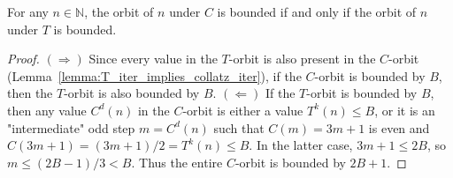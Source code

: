 \begin{lemma}\label{lemma:collatz_bounded_iff_compact_collatz_bounded}\leanok
For any $n \in \mathbb{N}$, the orbit of $n$ under $C$ is bounded if and only if the orbit of $n$ under $T$ is bounded.
\end{lemma}
\begin{proof}\leanok
$(\Rightarrow)$ Since every value in the $T$-orbit is also present in the $C$-orbit (Lemma~\ref{lemma:T_iter_implies_collatz_iter}), if the $C$-orbit is bounded by $B$, then the $T$-orbit is also bounded by $B$.
$(\Leftarrow)$ If the $T$-orbit is bounded by $B$, then any value $C^d(n)$ in the $C$-orbit is either a value $T^k(n) \le B$, or it is an "intermediate" odd step $m = C^d(n)$ such that $C(m) = 3m+1$ is even and $C(3m+1) = (3m+1)/2 = T^k(n) \le B$. In the latter case, $3m+1 \le 2B$, so $m \le (2B-1)/3 < B$. Thus the entire $C$-orbit is bounded by $2B+1$.
\end{proof}

